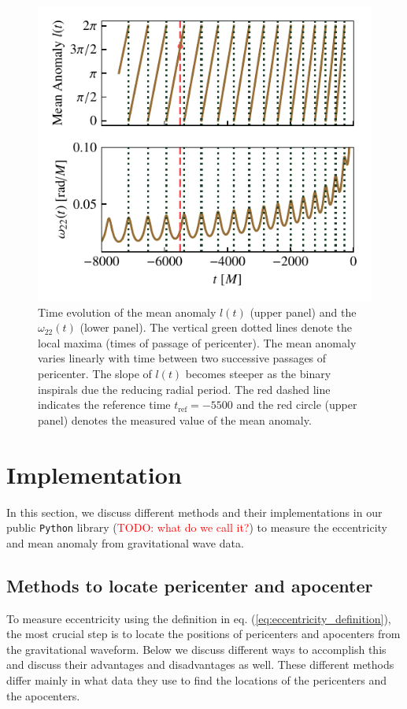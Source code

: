 \documentclass[aps,prd,amsmath,floats,floatfix, twocolumn,
superscriptaddress,nofootinbib,showpacs]{revtex4-1}
\newcommand{\red}{\textcolor{red}}
\newcommand{\TODO}[1]{\red{TODO: #1}}
\begin{document}
\begin{figure}
\begin{minipage}[t]{0.475\textwidth}
    \includegraphics[width=\columnwidth]{mean_ano_definition}
    \caption{
      Time evolution of the mean anomaly $l(t)$ (upper panel) and
      the $\omega_{22}(t)$ (lower panel). The vertical green dotted lines
      denote the local maxima (times of passage of pericenter). The mean
      anomaly varies linearly with time between two successive passages of
      pericenter. The slope of $l(t)$ becomes steeper as the binary
      inspirals due the reducing radial period. The red dashed line
      indicates the reference time $t_{\text{ref}}=-5500$ and the red circle
      (upper panel) denotes the measured value of the mean anomaly.}
    \label{fig:mean_anomaly_definition}
  \end{minipage}
\end{figure}

\section{Implementation}
\label{sec:implementation}
In this section, we discuss different methods and their
implementations in our public \texttt{Python} library (\TODO{what do
  we call it?}) to measure the eccentricity and mean anomaly from
gravitational wave data.

\subsection{Methods to locate pericenter and apocenter}
\label{sec:method-to-locate-pericenter-and-apocenter}
To measure eccentricity using the definition in
eq. (\ref{eq:eccentricity_definition}), the most crucial step is to
locate the positions of pericenters and apocenters from the
gravitational waveform. Below we discuss different ways to accomplish
this and discuss their advantages and disadvantages as well. These
different methods differ mainly in what data they use to
find the locations of the pericenters and the apocenters.
\end{document}
